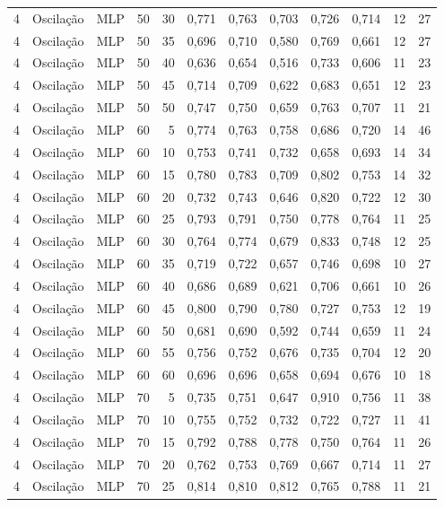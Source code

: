 \begin{longtable}{@{}rllrrrrrrrrr@{}}
4 & Oscilação & MLP & 50 & 30 & 0,771 & 0,763 & 0,703 & 0,726 & 0,714 & 12 & 27 \\
4 & Oscilação & MLP & 50 & 35 & 0,696 & 0,710 & 0,580 & 0,769 & 0,661 & 12 & 27 \\
4 & Oscilação & MLP & 50 & 40 & 0,636 & 0,654 & 0,516 & 0,733 & 0,606 & 11 & 23 \\
4 & Oscilação & MLP & 50 & 45 & 0,714 & 0,709 & 0,622 & 0,683 & 0,651 & 12 & 23 \\
4 & Oscilação & MLP & 50 & 50 & 0,747 & 0,750 & 0,659 & 0,763 & 0,707 & 11 & 21 \\
4 & Oscilação & MLP & 60 & 5 & 0,774 & 0,763 & 0,758 & 0,686 & 0,720 & 14 & 46 \\
4 & Oscilação & MLP & 60 & 10 & 0,753 & 0,741 & 0,732 & 0,658 & 0,693 & 14 & 34 \\
4 & Oscilação & MLP & 60 & 15 & 0,780 & 0,783 & 0,709 & 0,802 & 0,753 & 14 & 32 \\
4 & Oscilação & MLP & 60 & 20 & 0,732 & 0,743 & 0,646 & 0,820 & 0,722 & 12 & 30 \\
4 & Oscilação & MLP & 60 & 25 & 0,793 & 0,791 & 0,750 & 0,778 & 0,764 & 11 & 25 \\
4 & Oscilação & MLP & 60 & 30 & 0,764 & 0,774 & 0,679 & 0,833 & 0,748 & 12 & 25 \\
4 & Oscilação & MLP & 60 & 35 & 0,719 & 0,722 & 0,657 & 0,746 & 0,698 & 10 & 27 \\
4 & Oscilação & MLP & 60 & 40 & 0,686 & 0,689 & 0,621 & 0,706 & 0,661 & 10 & 26 \\
4 & Oscilação & MLP & 60 & 45 & 0,800 & 0,790 & 0,780 & 0,727 & 0,753 & 12 & 19 \\
4 & Oscilação & MLP & 60 & 50 & 0,681 & 0,690 & 0,592 & 0,744 & 0,659 & 11 & 24 \\
4 & Oscilação & MLP & 60 & 55 & 0,756 & 0,752 & 0,676 & 0,735 & 0,704 & 12 & 20 \\
4 & Oscilação & MLP & 60 & 60 & 0,696 & 0,696 & 0,658 & 0,694 & 0,676 & 10 & 18 \\
4 & Oscilação & MLP & 70 & 5 & 0,735 & 0,751 & 0,647 & 0,910 & 0,756 & 11 & 38 \\
4 & Oscilação & MLP & 70 & 10 & 0,755 & 0,752 & 0,732 & 0,722 & 0,727 & 11 & 41 \\
4 & Oscilação & MLP & 70 & 15 & 0,792 & 0,788 & 0,778 & 0,750 & 0,764 & 11 & 26 \\
4 & Oscilação & MLP & 70 & 20 & 0,762 & 0,753 & 0,769 & 0,667 & 0,714 & 11 & 27 \\
4 & Oscilação & MLP & 70 & 25 & 0,814 & 0,810 & 0,812 & 0,765 & 0,788 & 11 & 21 \\

\end{longtable}
